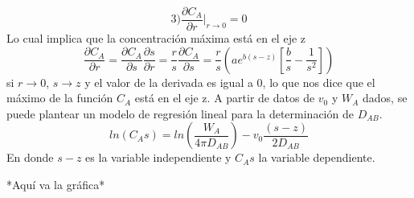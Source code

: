 \begin{equation*}
     3) \frac{\partial C_A}{\partial r}|_{r\rightarrow0}=0
 \end{equation*}
 Lo cual implica que la concentración máxima está en el eje z
 \begin{equation*}
    \frac{\partial C_A}{\partial r}=\frac{\partial C_A}{\partial s}\frac{\partial s}{\partial r}=\frac{r}{s}\frac{\partial C_A}{\partial s}=\frac{r}{s}(ae^{b(s-z)}[\frac{b}{s}-\frac{1}{s^2}])
 \end{equation*}
 si $r\rightarrow0$, $s\rightarrow z$ y el valor de la derivada es igual a 0, lo que nos dice que el máximo de la función $C_A$ está en el eje z.
 A partir de datos de $v_0$ y $W_A$ dados, se puede plantear un modelo de regresión lineal para la determinación de $D_{AB}$.
 \begin{equation*}
     ln(C_As)=ln(\frac{W_A}{4\pi D_{AB}})-v_0\frac{(s-z)}{2D_{AB}}
 \end{equation*}
 En donde $s-z$ es la variable independiente y $C_As$ la variable dependiente.

 *Aquí va la gráfica* %
